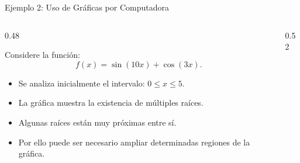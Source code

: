 \documentclass[../../main.tex]{subfiles}
\begin{document}

\begin{frame}{Ejemplo 2: Uso de Gráficas por Computadora}

\begin{columns}

\begin{column}{0.48\textwidth}

Considere la función:
\[
f(x)=\sin(10x)+\cos(3x).
\]
\begin{itemize}
    \item Se analiza inicialmente el intervalo:
    \(
    0\leq x\leq5.
    \)
    \item La gráfica muestra la existencia de múltiples raíces.
    \item Algunas raíces están muy próximas entre sí.
    \item Por ello puede ser necesario ampliar determinadas regiones de la gráfica.

\end{itemize}

\end{column}


\begin{column}{0.52\textwidth}

\centering


\end{column}

\end{columns}

\end{frame}


\end{document}
